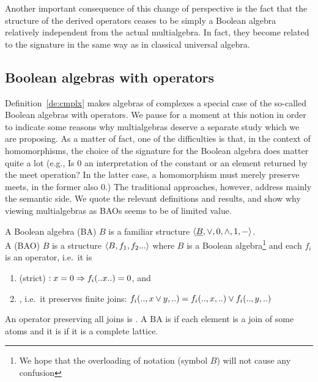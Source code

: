 \documentclass[10pt]{article}
\begin{document}
Another important consequence of this change of perspective is the
fact that the structure of the derived operators ceases to be simply
a Boolean algebra relatively independent from the actual
multialgebra. In fact, they become related to the signature in the
same way as in classical universal algebra.


\subsection{Boolean algebras with operators}
\label{sub:bao}

Definition~\ref{de:cmplx} makes algebras of complexes a special case of the
so-called Boolean algebras with operators.
We pause for a moment at this notion in
order to indicate some reasons why multialgebras deserve a separate
study which we are proposing. 
As a matter of fact, one of the difficulties is that, in the context of
homomorphisms, the choice of the
signature for the Boolean algebra does matter quite a lot (e.g., Is 0 an
interpretation of the 
constant or an element returned by the meet operation? In the latter case, 
a homomorphism must merely preserve meets, in the former also 0.) 
The traditional
approaches, however, address mainly the semantic side. We quote the
relevant definitions and results, and show why viewing multialgebras 
as BAOs seems to be of limited value. 

\begin{Definition}[\cite{JT1}]
A Boolean algebra (BA) $B$ is a familiar structure $\langle\underline {B},\lor,0,\land,1,-\rangle$. \\ 
A  (BAO) $B$ is a structure
$\langle B,f_1,f_2...\rangle$ where $B$ is a Boolean algebra\footnote{We hope
that the overloading of notation (symbol $B$) will not cause any
confusion} and each $f_i$ is an operator, i.e.\ it is
\begin{enumerate}\MyLPar
\item {} (strict) $:x=0\Rightarrow f_i(..x..)=0$, and
\item {}, i.e.\ it preserves finite joins: 
      $f_i(..,x\lor y,..) = f_i(..,x,..)\lor f_i(..,y,..)$
\end{enumerate}
An operator preserving all joins is .  A BA
is  if each element is a join of some atoms and it is 
 if it is a complete lattice.
\end{Definition}
\end{document}
